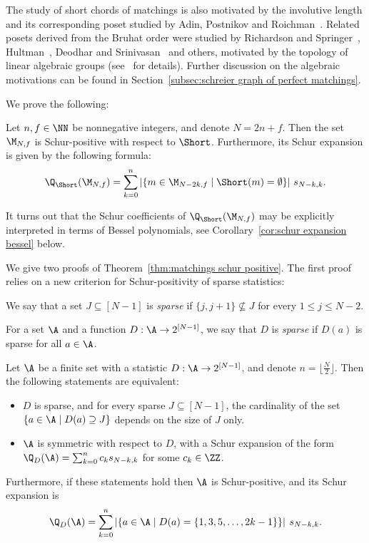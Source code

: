 The study of short chords of matchings is also motivated by the involutive length and its corresponding poset studied by Adin, Postnikov and Roichman~\cite{gelfand_involutions}. Related posets derived from the Bruhat order were studied by Richardson and Springer~\cite{richardson1990bruhat}, Hultman~\cite{hultman2008twisted}, Deodhar and Srinivasan~\cite{deodhar2001statistic} and others, motivated by the topology of linear algebraic groups (see~\cite{hultman2008twisted} for details). Further discussion on the algebraic motivations can be found in Section~\ref{subsec:schreier graph of perfect matchings}.




We prove the following:
\begin{theorem}
\label{thm:matchings schur positive}
    Let $n,f \in \NN$ be nonnegative integers, and denote $N=2n+f$. Then the set $\M_{N,f}$ is Schur-positive with respect to $\Short$. Furthermore, its Schur expansion is given by the following formula:
    \[
        \Q_{\Short} (\M_{N,f}) = \sum_{k=0}^n |\{ m\in \M_{N-2k,f} \mid \Short(m) = \emptyset\}|\ s_{N-k,k}.
    \]
\end{theorem}

It turns out  that the Schur coefficients of $\Q_{\Short} (\M_{N,f})$ 
may be explicitly interpreted in terms of Bessel polynomials, see 
Corollary~\ref{cor:schur expansion bessel} 
below.




We give two proofs of Theorem~\ref{thm:matchings schur positive}. The first proof relies on a new criterion for Schur-positivity of sparse statistics:

\begin{definition}
\label{def:sparse}
    We say that a set $J \subseteq [N-1]$ is \emph{sparse} if $\{j,j+1\} \nsubseteq J$ for every $1 \le j \le N-2$.

    For a set $\A$ and a function $D:\A \to 2^{[N-1]}$, we say that $D$ is \emph{sparse} if $D(a)$ is sparse for all $a \in \A$.
\end{definition}

\begin{theorem}
\label{thm:criterion schur positive two rows}
    Let $\A$ be a finite set with a statistic $D:\A \to 2^{[N-1]}$, and denote $n = \lfloor\frac{N}{2} \rfloor$. Then the following statements are equivalent:
    \begin{itemize}
        \item $D$ is sparse, and for every sparse $J \subseteq [N-1]$, the cardinality of the set $\{a \in \A \mid D(a) \supseteq J\}$ depends on the size of $J$ only.
        \item $\A$ is symmetric with respect to $D$, with a Schur expansion of the form $\Q_{D}(\A) = \sum_{k=0}^n c_k s_{N-k,k}$ for some $c_k \in \ZZ$.
    \end{itemize}

    Furthermore, if these statements hold then $\A$ is Schur-positive, and its Schur expansion is
    \[
        \Q_{D} (\A) = \sum_{k=0}^n \left|\left\{ a\in \A \mid D(a) = \{1,3,5,\dots, 2k-1\} \right\}\right|\: s_{N-k,k}.
    \]
    
\end{theorem}

